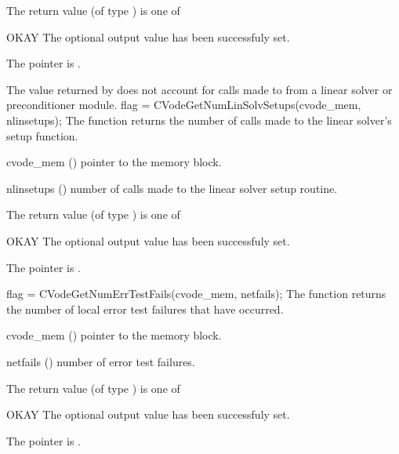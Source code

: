 {
  The return value  (of type ) is one of
  \begin{args}
  \item[OKAY] 
    The optional output value has been successfuly set.
  \item[\Id{CVG\_NO\_MEM}]
    The  pointer is .
  \end{args}
}
{
  The  value returned by  does not
  account for calls made to  from a linear solver or preconditioner 
  module. 
}
{
  flag = CVodeGetNumLinSolvSetups(cvode\_mem, nlinsetups);
}
{
  The function  returns the
  number of calls made to the linear solver's setup function.
}
{
  \begin{args}[nlinsetups]
  \item[cvode\_mem] ()
    pointer to the {\cvodes} memory block.
  \item[nlinsetups] ()
    number of calls made to the linear solver setup routine.
  \end{args}
}
{
  The return value  (of type ) is one of
  \begin{args}
  \item[OKAY] 
    The optional output value has been successfuly set.
  \item[\Id{CVG\_NO\_MEM}]
    The  pointer is .
  \end{args}
}
{}
{
  flag = CVodeGetNumErrTestFails(cvode\_mem, netfails);
}
{
  The function  returns the
  number of local error test failures that have occurred.
}
{
  \begin{args}
  \item[cvode\_mem] ()
    pointer to the {\cvodes} memory block.
  \item[netfails] ()
    number of error test failures.
  \end{args}
}
{
  The return value  (of type ) is one of
  \begin{args}
  \item[OKAY] 
    The optional output value has been successfuly set.
  \item[\Id{CVG\_NO\_MEM}]
    The  pointer is .
  \end{args}
}
{}
